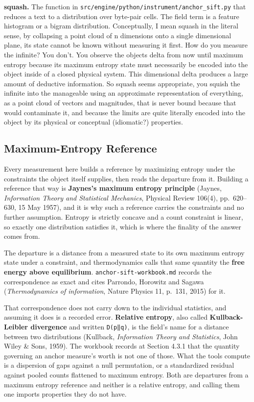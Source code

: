 \noindent\textbf{squash.} The function in \texttt{src/\allowbreak{}engine/\allowbreak{}python/\allowbreak{}instrument/\allowbreak{}anchor\_\allowbreak{}sift.\allowbreak{}py} that reduces a text to a distribution over byte-pair cells. The field term is a feature histogram or a bigram distribution. Conceptually, I mean squash in the literal sense, by collapsing a point cloud of n dimensions onto a single dimensional plane, its state cannot be known without measuring it first. How do you measure the infinite? You don't. You observe the objects delta from now until maximum entropy because its maximum entropy state must necessarily be encoded into the object inside of a closed physical system. This dimensional delta produces a large amount of deductive information. So squash seems appropriate, you squish the infinite into the manageable using an approximate representation of everything, as a point cloud of vectors and magnitudes, that is never bound because that would contaminate it, and because the limits are quite literally encoded into the object by its physical or conceptual (idiomatic?) properties.

\subsection{Maximum-Entropy Reference}

Every measurement here builds a reference by maximizing entropy under the constraints the object itself supplies, then reads the departure from it. Building a reference that way is \textbf{Jaynes's maximum entropy principle} (Jaynes, \emph{Information Theory and Statistical Mechanics}, Physical Review 106(4), pp.~620--630, 15 May 1957), and it is why such a reference carries the constraints and no further assumption. Entropy is strictly concave and a count constraint is linear, so exactly one distribution satisfies it, which is where the finality of the answer comes from.

The departure is a distance from a measured state to its own maximum entropy state under a constraint, and thermodynamics calls that same quantity the \textbf{free energy above equilibrium}. \texttt{anchor-\allowbreak{}sift-\allowbreak{}workbook.\allowbreak{}md} records the correspondence as exact and cites Parrondo, Horowitz and Sagawa (\emph{Thermodynamics of information}, Nature Physics 11, p.~131, 2015) for it.

That correspondence does not carry down to the individual statistics, and assuming it does is a recorded error. \textbf{Relative entropy}, also called \textbf{Kullback-Leibler divergence} and written \texttt{D(p‖q)}, is the field's name for a distance between two distributions (Kullback, \emph{Information Theory and Statistics}, John Wiley \& Sons, 1959). The workbook records at Section 4.3.1 that the quantity governing an anchor measure's worth is not one of those. What the tools compute is a dispersion of gaps against a null permutation, or a standardized residual against pooled counts flattened to maximum entropy. Both are departures from a maximum entropy reference and neither is a relative entropy, and calling them one imports properties they do not have.

